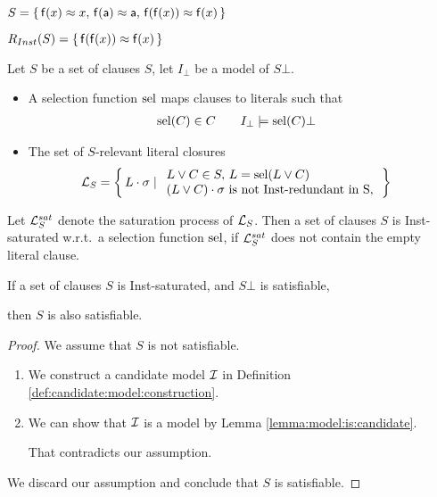 \begin{example}
    $S =
        \{\,
        \mathsf{f}(x)\approx x,\,
        \mathsf{f}(\mathsf{a})\approx \mathsf{a},\,
        \mathsf{f}(\mathsf{f}(x))\approx\mathsf{f}(x)
        \,\}$

    $R_{Inst}(S) = \{\, \mathsf{f}(\mathsf{f}(x))\approx\mathsf{f}(x) \,\}$
    \end{example}

    \begin{definition}[S-Relevance]
        Let $S$ be a set of clauses $S$, let $I_\bot$ be a model of $S\bot$.

        \begin{itemize}
            \item
        A selection function $\operatorname{sel}$ maps clauses to literals such that
        \begin{align*}
            \operatorname{sel}(C)&\in C
            &&&
            I_\bot&\models\operatorname{sel}(C)\bot
        \end{align*}

        \item
        The set of $S$-relevant literal closures
        \begin{align*}
            \mathcal{L}_S &= \left\{\, L\cdot\sigma \mid
            \begin{array}{l}
                L\lor C\in S,\,L = \operatorname{sel}(L\lor C)\\
                (L\lor C)\cdot\sigma\text{ is not Inst-redundant in S},\\
            \end{array}
            \,\right\}
        \end{align*}




    \end{itemize}
\end{definition}

\begin{definition}
    Let $\mathcal{L}_S^{sat}$ denote the saturation process of $\mathcal{L}_S$.
    Then a set of clauses $S$ is Inst-saturated w.r.t.~a selection function $\operatorname{sel}$,
            if $\mathcal{L}_S^{sat}$ does not contain the empty literal clause.
\end{definition}
        \begin{theorem}
        If a set of clauses $S$ is Inst-saturated,
        and $S\bot$ is satisfiable,

        then $S$ is also satisfiable.
        \end{theorem}

        \begin{proof} We assume that $S$ is not satisfiable.
            \begin{enumerate}
                \item We construct a candidate model $\mathcal{I}$ in Definition \vref{def:candidate:model:construction}.
                \item We can show that $\mathcal{I}$ is a model by Lemma \vref{lemma:model:is:candidate}.

                That contradicts our assumption.
            \end{enumerate}
            We discard our assumption and conclude that $S$ is satisfiable.
            \end{proof}

